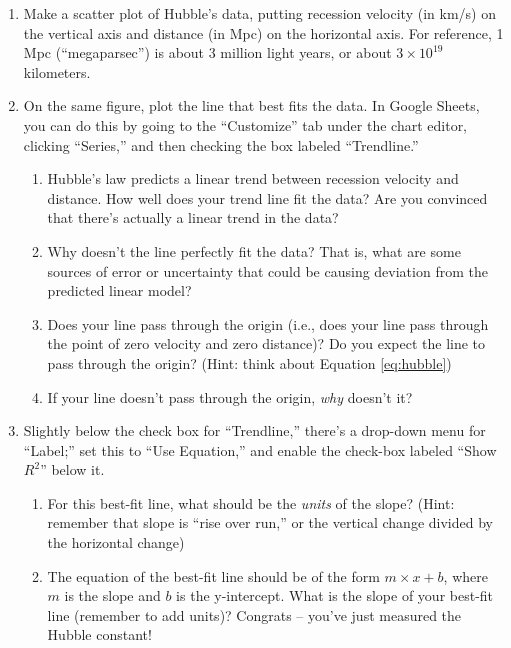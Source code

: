 \documentclass[11pt]{article}
\begin{document}
\begin{enumerate}
    \item Make a scatter plot of Hubble's data, putting recession velocity (in km/s) on the vertical axis and distance (in Mpc) on the horizontal axis. For reference, 1 Mpc (``megaparsec'') is about 3 million light years, or about $3 \times 10^{19}$ kilometers.
    
    \item On the same figure, plot the line that best fits the data. In Google Sheets, you can do this by going to the ``Customize'' tab under the chart editor, clicking ``Series,'' and then checking the box labeled ``Trendline.'' 
        \begin{enumerate}
            \item Hubble's law predicts a linear trend between recession velocity and distance. How well does your trend line fit the data? Are you convinced that there's actually a linear trend in the data? 
            
            \item Why doesn't the line perfectly fit the data? That is, what are some sources of error or uncertainty that could be causing deviation from the predicted linear model?
            
            \item Does your line pass through the origin (i.e., does your line pass through the point of zero velocity and zero distance)? Do you expect the line to pass through the origin? (Hint: think about Equation \ref{eq:hubble})
            
            \item If your line doesn't pass through the origin, \emph{why} doesn't it? 
        \end{enumerate}
    
    \item Slightly below the check box for ``Trendline,'' there's a drop-down menu for ``Label;'' set this to ``Use Equation,'' and enable the check-box labeled ``Show $R^2$'' below it.
        \begin{enumerate}
            \item For this best-fit line, what should be the \emph{units} of the slope? (Hint: remember that slope is ``rise over run,'' or the vertical change divided by the horizontal change)
            
            \item The equation of the best-fit line should be of the form $m \times x + b$, where $m$ is the slope and $b$ is the y-intercept. What is the slope of your best-fit line (remember to add units)? Congrats -- you've just measured the Hubble constant!
            

\end{enumerate}
\end{enumerate}
\end{document}
